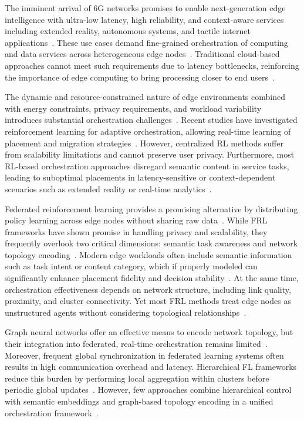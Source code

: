 \documentclass[conference]{IEEEtran}
\begin{document}
	The imminent arrival of 6G networks promises to enable next-generation edge intelligence with ultra-low latency, high reliability, and context-aware services including extended reality, autonomous systems, and tactile internet applications~\cite{cui2025}. These use cases demand fine-grained orchestration of computing and data services across heterogeneous edge nodes~\cite{shi2023}. Traditional cloud-based approaches cannot meet such requirements due to latency bottlenecks, reinforcing the importance of edge computing to bring processing closer to end users~\cite{vahabi2025}.
	
	The dynamic and resource-constrained nature of edge environments combined with energy constraints, privacy requirements, and workload variability introduces substantial orchestration challenges~\cite{yang2023rlcs}. Recent studies have investigated reinforcement learning for adaptive orchestration, allowing real-time learning of placement and migration strategies~\cite{shi2023}. However, centralized RL methods suffer from scalability limitations and cannot preserve user privacy. Furthermore, most RL-based orchestration approaches disregard semantic content in service tasks, leading to suboptimal placements in latency-sensitive or context-dependent scenarios such as extended reality or real-time analytics~\cite{zhang2025semantic}.
	
	Federated reinforcement learning provides a promising alternative by distributing policy learning across edge nodes without sharing raw data~\cite{wu2024topology}. While FRL frameworks have shown promise in handling privacy and scalability, they frequently overlook two critical dimensions: semantic task awareness and network topology encoding~\cite{ogenyi2025comprehensive, zhang2024optimizing}. Modern edge workloads often include semantic information such as task intent or content category, which if properly modeled can significantly enhance placement fidelity and decision stability~\cite{zhang2025semantic}. At the same time, orchestration effectiveness depends on network structure, including link quality, proximity, and cluster connectivity. Yet most FRL methods treat edge nodes as unstructured agents without considering topological relationships~\cite{wu2024topology}.
	
	Graph neural networks offer an effective means to encode network topology, but their integration into federated, real-time orchestration remains limited~\cite{makris2024gnnrl, zhang2024optimizing}. Moreover, frequent global synchronization in federated learning systems often results in high communication overhead and latency. Hierarchical FL frameworks reduce this burden by performing local aggregation within clusters before periodic global updates~\cite{sad2024fearless, he2022acefl}. However, few approaches combine hierarchical control with semantic embeddings and graph-based topology encoding in a unified orchestration framework~\cite{wu2024topology, vahabi2025}.
	
\end{document}
